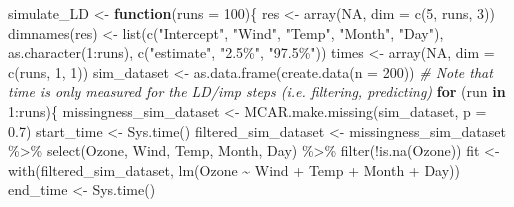 \documentclass[
]{article}
\newenvironment{Shaded}{\begin{snugshade}}{\end{snugshade}}
\newcommand{\AttributeTok}[1]{\textcolor[rgb]{0.77,0.63,0.00}{#1}}
\newcommand{\CommentTok}[1]{\textcolor[rgb]{0.56,0.35,0.01}{\textit{#1}}}
\newcommand{\ConstantTok}[1]{\textcolor[rgb]{0.00,0.00,0.00}{#1}}
\newcommand{\ControlFlowTok}[1]{\textcolor[rgb]{0.13,0.29,0.53}{\textbf{#1}}}
\newcommand{\DecValTok}[1]{\textcolor[rgb]{0.00,0.00,0.81}{#1}}
\newcommand{\FloatTok}[1]{\textcolor[rgb]{0.00,0.00,0.81}{#1}}
\newcommand{\FunctionTok}[1]{\textcolor[rgb]{0.00,0.00,0.00}{#1}}
\newcommand{\NormalTok}[1]{#1}
\newcommand{\OtherTok}[1]{\textcolor[rgb]{0.56,0.35,0.01}{#1}}
\newcommand{\SpecialCharTok}[1]{\textcolor[rgb]{0.00,0.00,0.00}{#1}}
\newcommand{\StringTok}[1]{\textcolor[rgb]{0.31,0.60,0.02}{#1}}
\begin{document}
\begin{Shaded}
\begin{Highlighting}[]
\NormalTok{simulate\_LD }\OtherTok{\textless{}{-}} \ControlFlowTok{function}\NormalTok{(}\AttributeTok{runs =} \DecValTok{100}\NormalTok{)\{}
\NormalTok{  res }\OtherTok{\textless{}{-}} \FunctionTok{array}\NormalTok{(}\ConstantTok{NA}\NormalTok{, }\AttributeTok{dim =} \FunctionTok{c}\NormalTok{(}\DecValTok{5}\NormalTok{, runs, }\DecValTok{3}\NormalTok{))}
  \FunctionTok{dimnames}\NormalTok{(res) }\OtherTok{\textless{}{-}} \FunctionTok{list}\NormalTok{(}\FunctionTok{c}\NormalTok{(}\StringTok{"Intercept"}\NormalTok{, }\StringTok{"Wind"}\NormalTok{, }\StringTok{"Temp"}\NormalTok{, }\StringTok{"Month"}\NormalTok{, }\StringTok{"Day"}\NormalTok{),}
                        \FunctionTok{as.character}\NormalTok{(}\DecValTok{1}\SpecialCharTok{:}\NormalTok{runs), }\FunctionTok{c}\NormalTok{(}\StringTok{"estimate"}\NormalTok{, }\StringTok{"2.5\%"}\NormalTok{, }\StringTok{"97.5\%"}\NormalTok{))}
\NormalTok{  times }\OtherTok{\textless{}{-}} \FunctionTok{array}\NormalTok{(}\ConstantTok{NA}\NormalTok{, }\AttributeTok{dim =} \FunctionTok{c}\NormalTok{(runs, }\DecValTok{1}\NormalTok{, }\DecValTok{1}\NormalTok{))}
\NormalTok{  sim\_dataset }\OtherTok{\textless{}{-}} \FunctionTok{as.data.frame}\NormalTok{(}\FunctionTok{create.data}\NormalTok{(}\AttributeTok{n =} \DecValTok{200}\NormalTok{))}
  \CommentTok{\# Note that time is only measured for the LD/imp steps (i.e. filtering, predicting)}
  \ControlFlowTok{for}\NormalTok{ (run }\ControlFlowTok{in} \DecValTok{1}\SpecialCharTok{:}\NormalTok{runs)\{}
\NormalTok{    missingness\_sim\_dataset }\OtherTok{\textless{}{-}} \FunctionTok{MCAR.make.missing}\NormalTok{(sim\_dataset, }\AttributeTok{p =} \FloatTok{0.7}\NormalTok{)}
\NormalTok{    start\_time }\OtherTok{\textless{}{-}} \FunctionTok{Sys.time}\NormalTok{()}
\NormalTok{    filtered\_sim\_dataset }\OtherTok{\textless{}{-}}\NormalTok{ missingness\_sim\_dataset }\SpecialCharTok{\%\textgreater{}\%} 
      \FunctionTok{select}\NormalTok{(Ozone, Wind, Temp, Month, Day) }\SpecialCharTok{\%\textgreater{}\%}
      \FunctionTok{filter}\NormalTok{(}\SpecialCharTok{!}\FunctionTok{is.na}\NormalTok{(Ozone))}
\NormalTok{    fit }\OtherTok{\textless{}{-}} \FunctionTok{with}\NormalTok{(filtered\_sim\_dataset, }\FunctionTok{lm}\NormalTok{(Ozone }\SpecialCharTok{\textasciitilde{}}\NormalTok{ Wind }\SpecialCharTok{+}\NormalTok{ Temp }\SpecialCharTok{+}\NormalTok{ Month }\SpecialCharTok{+}\NormalTok{ Day))}
\NormalTok{    end\_time }\OtherTok{\textless{}{-}} \FunctionTok{Sys.time}\NormalTok{()}

\end{Highlighting}
\end{Shaded}
\end{document}

